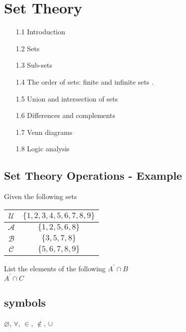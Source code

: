 \section*{Set Theory}

\begin{itemize}
\item[1.1] Introduction  
\item[1.2] Sets  
\item[1.3] Sub-sets  
\item[1.4] The order of sets: finite and infinite sets .
\item[1.5] Union and intersection of sets  
\item[1.6] Differences and complements  
\item[1.7] Venn diagrams  
\item[1.8] Logic analysis
\end{itemize}  







\subsection{Set Theory Operations - Example}


Given the following sets

\begin{center}
\begin{tabular}{|c|c|} \hline
$\mathcal{U}$ & $\{1,2,3,4,5,6,7,8,9\}$ \\ \hline
$\mathcal{A}$ & $\{1,2,5,6,8\}$ \\ \hline
$\mathcal{B}$ & $\{3,5,7,8\}$ \\ \hline
$\mathcal{C}$ & $\{5,6,7,8,9\}$ \\ \hline
\end{tabular}
\end{center}

List the elements of the following
$A^{\prime} \cap B $\\
$A^{\prime} \cap C $\\



\subsection*{symbols}
$\varnothing$,
$\forall$,
$\in$,
$\notin$,
$\cup$


